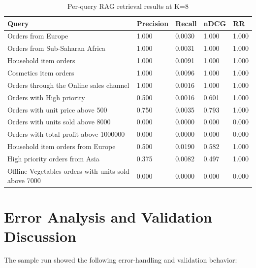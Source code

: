 \documentclass[12pt,a4paper,openany]{report}
\begin{document}
\begin{table}[H]
\centering
\caption{Per-query RAG retrieval results at K=8}
\label{tab:rag-k8-per-query}
\begin{tabular}{p{7.2cm} p{1.5cm} p{1.5cm} p{1.5cm} p{1.5cm}}
\hline
Query & Precision & Recall & nDCG & RR \\
\hline
Orders from Europe & 1.000 & 0.0030 & 1.000 & 1.000 \\
Orders from Sub-Saharan Africa & 1.000 & 0.0031 & 1.000 & 1.000 \\
Household item orders & 1.000 & 0.0091 & 1.000 & 1.000 \\
Cosmetics item orders & 1.000 & 0.0096 & 1.000 & 1.000 \\
Orders through the Online sales channel & 1.000 & 0.0016 & 1.000 & 1.000 \\
Orders with High priority & 0.500 & 0.0016 & 0.601 & 1.000 \\
Orders with unit price above 500 & 0.750 & 0.0035 & 0.793 & 1.000 \\
Orders with units sold above 8000 & 0.000 & 0.0000 & 0.000 & 0.000 \\
Orders with total profit above 1000000 & 0.000 & 0.0000 & 0.000 & 0.000 \\
Household item orders from Europe & 0.500 & 0.0190 & 0.582 & 1.000 \\
High priority orders from Asia & 0.375 & 0.0082 & 0.497 & 1.000 \\
Offline Vegetables orders with units sold above 7000 & 0.000 & 0.0000 & 0.000 & 0.000 \\
\hline
\end{tabular}
\end{table}

\section{Error Analysis and Validation Discussion}

The sample run showed the following error-handling and validation behavior:
\end{document}
